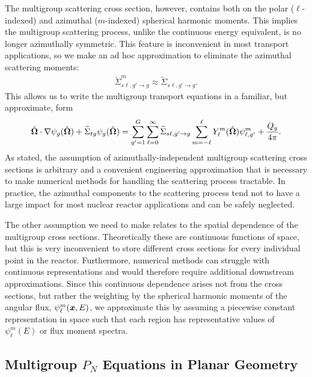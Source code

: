 The multigroup scattering cross section, however, contains both on the polar ($\ell$-indexed) and azimuthal ($m$-indexed) spherical harmonic moments. This implies the multigroup scattering process, unlike the continuous energy equivalent, is no longer azimuthally symmetric. This feature is inconvenient in most transport applications, so we make an ad hoc approximation to eliminate the azimuthal scattering moments:
\begin{align} 
  \widetilde{\Sigma}_{s\ell,g' \rightarrow g}^m \approx \widetilde{\Sigma}_{s\ell,g' \rightarrow g} .
\end{align}
This allows us to write the multigroup transport equations in a familiar, but approximate, form
\begin{align} \label{Eq:Neutronics_Multigroup3DTransportEquation}
  \hat{\mathbf{\Omega}} \cdot \nabla \psi_g(\hat{\mathbf{\Omega}}) + \widetilde{\Sigma}_{tg} \psi_g(\hat{\mathbf{\Omega}}) = \sum_{g'=1}^G \sum_{\ell=0}^\infty \widetilde{\Sigma}_{s\ell,g' \rightarrow g}  \sum_{m=-\ell}^\ell Y_\ell^m(\hat{\mathbf{\Omega}}) \psi_{\ell,g'}^m + \frac{Q_g}{4\pi}.
\end{align}
As stated, the assumption of azimuthally-independent multigroup scattering cross sections is arbitrary and a convenient engineering approximation that is necessary to make numerical methods for handling the scattering process tractable. In practice, the azimuthal components to the scattering process tend not to have a large impact for most nuclear reactor applications and can be safely neglected.

The other assumption we need to make relates to the spatial dependence of the multigroup cross sections. Theoretically these are continuous functions of space, but this is very inconvenient to store different cross sections for every individual point in the reactor. Furthermore, numerical methods can struggle with continuous representations and would therefore require additional downstream approximations. Since this continuous dependence arises not from the cross sections, but rather the weighting by the spherical harmonic moments of the angular flux, $\psi_\ell^m(\bm{x},E)$, we approximate this by assuming a piecewise constant representation in space such that each region has representative values of $\psi_\ell^m(E)$ or flux moment spectra.

\subsection{Multigroup $P_N$ Equations in Planar Geometry}

